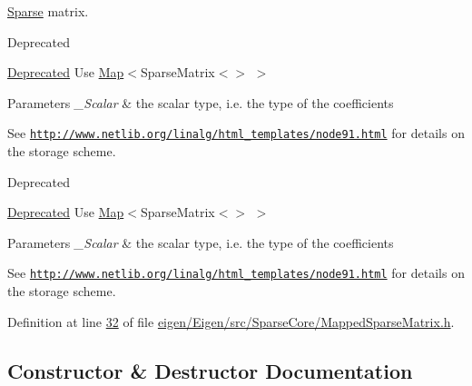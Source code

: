 \hyperlink{struct_eigen_1_1_sparse}{Sparse} matrix. 

\begin{DoxyRefDesc}{Deprecated}
\item[\hyperlink{deprecated__deprecated000037}{Deprecated}]Use \hyperlink{group___core___module_class_eigen_1_1_map}{Map}$<$Sparse\+Matrix$<$$>$ $>$\end{DoxyRefDesc}

\begin{DoxyParams}{Parameters}
{\em \+\_\+\+Scalar} & the scalar type, i.\+e. the type of the coefficients\\
\hline
\end{DoxyParams}
See \href{http://www.netlib.org/linalg/html_templates/node91.html}{\tt http\+://www.\+netlib.\+org/linalg/html\+\_\+templates/node91.\+html} for details on the storage scheme.

\begin{DoxyRefDesc}{Deprecated}
\item[\hyperlink{deprecated__deprecated000081}{Deprecated}]Use \hyperlink{group___core___module_class_eigen_1_1_map}{Map}$<$Sparse\+Matrix$<$$>$ $>$\end{DoxyRefDesc}

\begin{DoxyParams}{Parameters}
{\em \+\_\+\+Scalar} & the scalar type, i.\+e. the type of the coefficients\\
\hline
\end{DoxyParams}
See \href{http://www.netlib.org/linalg/html_templates/node91.html}{\tt http\+://www.\+netlib.\+org/linalg/html\+\_\+templates/node91.\+html} for details on the storage scheme. 

Definition at line \hyperlink{eigen_2_eigen_2src_2_sparse_core_2_mapped_sparse_matrix_8h_source_l00032}{32} of file \hyperlink{eigen_2_eigen_2src_2_sparse_core_2_mapped_sparse_matrix_8h_source}{eigen/\+Eigen/src/\+Sparse\+Core/\+Mapped\+Sparse\+Matrix.\+h}.



\subsection{Constructor \& Destructor Documentation}
\mbox{\label{class_eigen_1_1_mapped_sparse_matrix_a0c36a53853f1659ea59447bcb9a20799}} 
